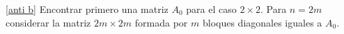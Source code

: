 \documentclass[12pt]{amsart}
\begin{document}
\eqref{anti b} Encontrar primero una matriz $A_0$ para el caso $2\times 2$. Para $n = 2m$ considerar la matriz $2m \times 2m$ formada por $m$ bloques diagonales iguales a $A_0$.
%
%
%
%
\end{document}

